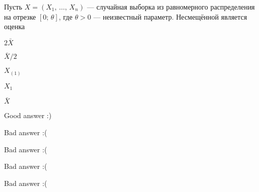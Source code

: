 
\begin{question}
Пусть \(X = (X_1, \, \ldots, \, X_n)\) — случайная выборка из
равномерного распределения на отрезке \([0; \, \theta]\), где
\(\theta > 0\) — неизвестный параметр. Несмещённой является оценка
\begin{answerlist}
  \item \(2 \bar{X}\)
  \item \(\bar{X} / 2\)
  \item \(X_{(1)}\)
  \item \(X_{1}\)
  \item \(\bar{X}\)
\end{answerlist}
\end{question}

\begin{solution}
\begin{answerlist}
  \item Good answer :)
  \item Bad answer :(
  \item Bad answer :(
  \item Bad answer :(
  \item Bad answer :(
\end{answerlist}
\end{solution}

